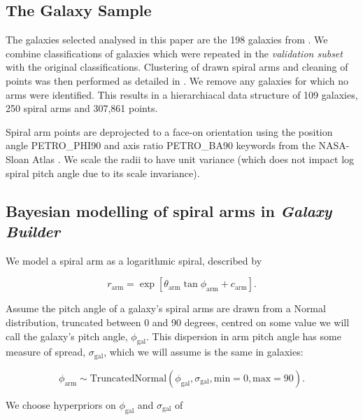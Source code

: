 \subsection{The Galaxy Sample}
The galaxies selected analysed in this paper are the 198 galaxies from . We combine classifications of galaxies which were repeated in the \textit{validation subset} with the original classifications. Clustering of drawn spiral arms and cleaning of points was then performed as detailed in . We remove any galaxies for which no arms were identified. This results in a hierarchiacal data structure of 109 galaxies, 250 spiral arms and 307,861 points.

Spiral arm points are deprojected to a face-on orientation using the position angle \textsc{PETRO\_PHI90} and axis ratio \textsc{PETRO\_BA90} keywords from the NASA-Sloan Atlas . We scale the radii to have unit variance (which does not impact log spiral pitch angle due to its scale invariance).


\subsection{Bayesian modelling of spiral arms in \textit{Galaxy Builder}}

We model a spiral arm as a logarithmic spiral, described by

\begin{equation}
r_\mathrm{arm} = \exp\left[\theta_\mathrm{arm}\tan\phi_\mathrm{arm} + c_\mathrm{arm}\right].
\end{equation}

Assume the pitch angle of a galaxy's spiral arms are drawn from a Normal distribution, truncated between 0 and 90 degrees, centred on some value we will call the galaxy's pitch angle, $\phi_\mathrm{gal}$. This dispersion in arm pitch angle has some measure of spread, $\sigma_\mathrm{gal}$, which we will assume is the same in galaxies:

\begin{equation}
\phi_\mathrm{arm} \sim \mathrm{TruncatedNormal}(\phi_\mathrm{gal}, \sigma_\mathrm{gal}, \mathrm{min}=0, \mathrm{max}=90).
\end{equation}

We choose hyperpriors on $\phi_\mathrm{gal}$ and $\sigma_\mathrm{gal}$ of

